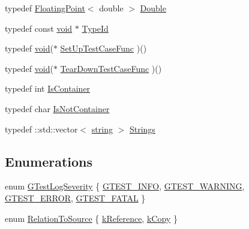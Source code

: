 \begin{DoxyCompactItemize}
\item 
typedef \hyperlink{classtesting_1_1internal_1_1FloatingPoint}{Floating\-Point}$<$ double $>$ \hyperlink{namespacetesting_1_1internal_a66a7579b1893b260c31dad577f7a5c48}{Double}
\item 
typedef const \hyperlink{legacy_8hpp_a8bb47f092d473522721002c86c13b94e}{void} $\ast$ \hyperlink{namespacetesting_1_1internal_ab1114197d3c657d8b7f8e0c5caa12d00}{Type\-Id}
\item 
typedef \hyperlink{legacy_8hpp_a8bb47f092d473522721002c86c13b94e}{void}($\ast$ \hyperlink{namespacetesting_1_1internal_ada14d66b5460b20e09071f51b9885c8d}{Set\-Up\-Test\-Case\-Func} )()
\item 
typedef \hyperlink{legacy_8hpp_a8bb47f092d473522721002c86c13b94e}{void}($\ast$ \hyperlink{namespacetesting_1_1internal_aad40244621b68546f3b830696225bf9b}{Tear\-Down\-Test\-Case\-Func} )()
\item 
typedef int \hyperlink{namespacetesting_1_1internal_ad8f0c2883245f1df2a53618a49f0deb3}{Is\-Container}
\item 
typedef char \hyperlink{namespacetesting_1_1internal_abf080521ce135deb510e0a7830fd3d33}{Is\-Not\-Container}
\item 
typedef \-::std\-::vector$<$ \hyperlink{namespacetesting_1_1internal_a8e8ff5b11e64078831112677156cb111}{string} $>$ \hyperlink{namespacetesting_1_1internal_a7706b17f05f4b49e351b052ae4e05073}{Strings}
\end{DoxyCompactItemize}
\subsection*{Enumerations}
\begin{DoxyCompactItemize}
\item 
enum \hyperlink{namespacetesting_1_1internal_aa6255ef3b023c5b4e1a2198d887fb977}{G\-Test\-Log\-Severity} \{ \hyperlink{namespacetesting_1_1internal_aa6255ef3b023c5b4e1a2198d887fb977aff315e0913fcda86fe4de882bf5e33e9}{G\-T\-E\-S\-T\-\_\-\-I\-N\-F\-O}, 
\hyperlink{namespacetesting_1_1internal_aa6255ef3b023c5b4e1a2198d887fb977a7a051bc2794f15a4bf0eab40562a304c}{G\-T\-E\-S\-T\-\_\-\-W\-A\-R\-N\-I\-N\-G}, 
\hyperlink{namespacetesting_1_1internal_aa6255ef3b023c5b4e1a2198d887fb977a651e9cd2a904e0c8210536271b875f75}{G\-T\-E\-S\-T\-\_\-\-E\-R\-R\-O\-R}, 
\hyperlink{namespacetesting_1_1internal_aa6255ef3b023c5b4e1a2198d887fb977a75063567740f6bf7da419b1b9197b12e}{G\-T\-E\-S\-T\-\_\-\-F\-A\-T\-A\-L}
 \}
\item 
enum \hyperlink{namespacetesting_1_1internal_aec4f0eeb60b6b8af8dcf979578bbf3bb}{Relation\-To\-Source} \{ \hyperlink{namespacetesting_1_1internal_aec4f0eeb60b6b8af8dcf979578bbf3bba75535e620e7496a433bf008ea81358a1}{k\-Reference}, 
\hyperlink{namespacetesting_1_1internal_aec4f0eeb60b6b8af8dcf979578bbf3bba272b78aee8068aa2392dbdcf69dfe3a4}{k\-Copy}
 \}
\end{DoxyCompactItemize}
